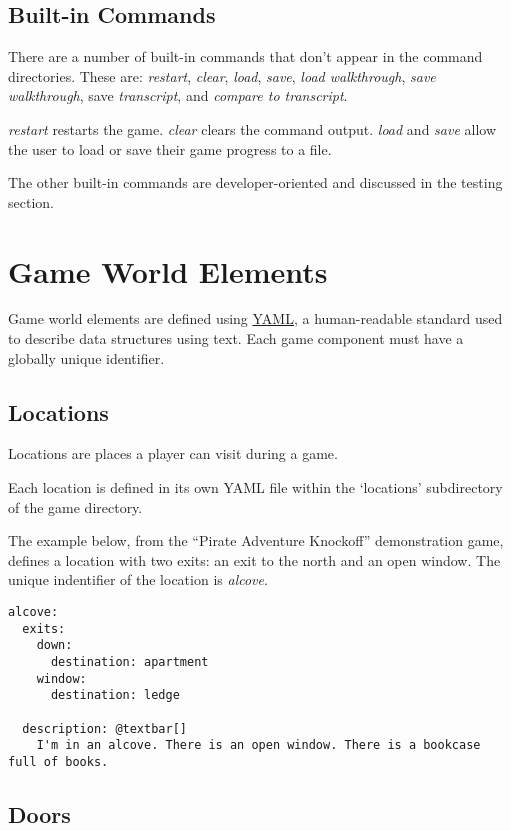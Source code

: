 \documentclass[letterpaper,10pt,english]{manual}
\begin{document}
\section{Built-in Commands}

There are a number of built-in commands that don't appear in the command directories. These are: \emph{restart}, \emph{clear}, \emph{load}, \emph{save}, \emph{load walkthrough}, \emph{save walkthrough}, save \emph{transcript}, and \emph{compare to transcript}.

\emph{restart} restarts the game. \emph{clear} clears the command output. \emph{load} and \emph{save} allow the user to load or save their game progress to a file.

The other built-in commands are developer-oriented and discussed in the testing section.

\resetcurrentobjects
\hypertarget{--doc-elements}{}

\chapter{Game World Elements}

Game world elements are defined using \href{http://www.yaml.org/}{YAML}, a human-readable standard used to describe data structures using text. Each game component must have a globally unique identifier.


\section{Locations}

Locations are places a player can visit during a game.

Each location is defined in its own YAML file within the `locations' subdirectory of the game directory.

The example below, from the ``Pirate Adventure Knockoff'' demonstration game, defines a location with two exits: an exit to the north and an open window. The unique indentifier of the location is \emph{alcove}.

\begin{Verbatim}[commandchars=@\[\]]
alcove:
  exits:
    down:
      destination: apartment
    window:
      destination: ledge

  description: @textbar[]
    I'm in an alcove. There is an open window. There is a bookcase full of books.
\end{Verbatim}


\section{Doors}
\end{document}

